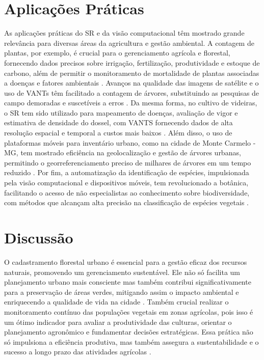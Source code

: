 \documentclass[
    12pt,                   %
    openright,              %
    oneside,                %
    a4paper,                %
    sumario=tradicional,    %
    english,                %
    brazil,                 %
    ]{abntex2}
\begin{document}
\section{Aplicações Práticas}
   As aplicações práticas do SR e da visão computacional têm mostrado grande relevância para diversas áreas da agricultura e gestão ambiental. A contagem de plantas, por exemplo, é crucial para o gerenciamento agrícola e florestal, fornecendo dados precisos sobre irrigação, fertilização, produtividade e estoque de carbono, além de permitir o monitoramento de mortalidade de plantas associadas a doenças e fatores ambientais \cite{daliakopoulos2009tree}. Avanços na qualidade das imagens de satélite e o uso de VANTs têm facilitado a contagem de árvores, substituindo as pesquisas de campo demoradas e suscetíveis a erros \cite{erigo}. Da mesma forma, no cultivo de videiras, o SR tem sido utilizado para mapeamento de doenças, avaliação de vigor e estimativa de densidade do dossel, com VANTS fornecendo dados de alta resolução espacial e temporal a custos mais baixos \cite{padua2020individual}. Além disso, o uso de plataformas móveis para inventário urbano, como na cidade de Monte Carmelo - MG, tem mostrado eficiência na geolocalização e gestão de árvores urbanas, permitindo o georreferenciamento preciso de milhares de árvores em um tempo reduzido \cite{barbosa2018quantificaccao}. Por fim, a automatização da identificação de espécies, impulsionada pela visão computacional e dispositivos móveis, tem revolucionado a botânica, facilitando o acesso de não especialistas ao conhecimento sobre biodiversidade, com métodos que alcançam alta precisão na classificação de espécies vegetais \cite{waldchen2018plant}.

\section{Discussão}


    O cadastramento florestal urbano é essencial para a gestão eficaz dos recursos naturais, promovendo um gerenciamento sustentável. Ele não só facilita um planejamento urbano mais consciente mas também contribui significativamente para a preservação de áreas verdes, mitigando assim o impacto ambiental e enriquecendo a qualidade de vida na cidade \cite{barbosa2018quantificaccao}. Também crucial realizar o monitoramento contínuo das populações vegetais em zonas agrícolas, pois isso é um ótimo indicador para avaliar a produtividade das culturas, orientar o planejamento agronômico e fundamentar decisões estratégicas. Essa prática não só impulsiona a eficiência produtiva, mas também assegura a sustentabilidade e o sucesso a longo prazo das atividades agrícolas \cite{sa2021detecccao}.
\end{document}
